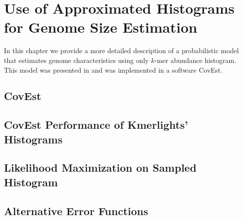 \chapter{Use of Approximated Histograms for Genome Size Estimation}
In this chapter we provide a more detailed description of a probabilistic model
that estimates genome characteristics using only $k$-mer abundance histogram.
This model was presented in \cite{Hozza2015, Hozza2016} and was implemented in a software CovEst.

\section{CovEst}

\section{CovEst Performance of Kmerlights' Histograms}

\section{Likelihood Maximization on Sampled Histogram}

\section{Alternative Error Functions}

